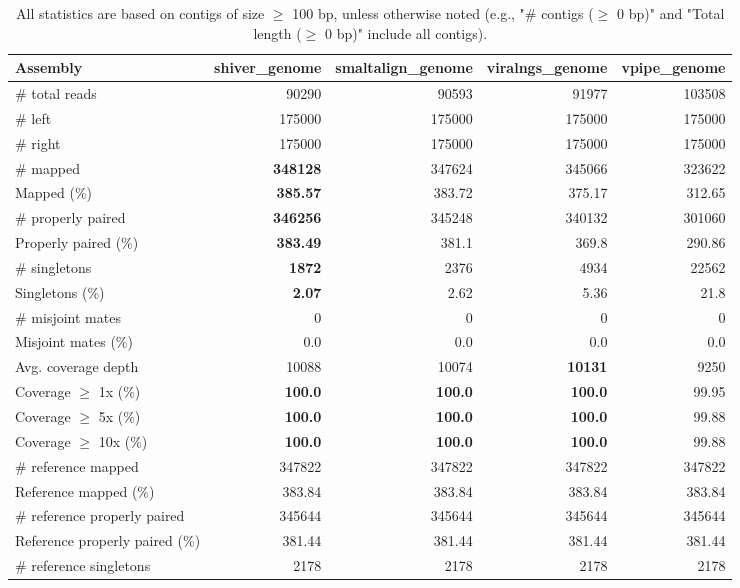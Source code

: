 \documentclass[12pt,a4paper]{article}
\begin{document}
\begin{table}[ht]
\begin{center}
\caption{All statistics are based on contigs of size $\geq$ 100 bp, unless otherwise noted (e.g., "\# contigs ($\geq$ 0 bp)" and "Total length ($\geq$ 0 bp)" include all contigs).}
\begin{tabular}{|l*{4}{|r}|}
\hline
Assembly & shiver\_genome & smaltalign\_genome & viralngs\_genome & vpipe\_genome \\ \hline
\# total reads & 90290 & 90593 & 91977 & 103508 \\ \hline
\# left & 175000 & 175000 & 175000 & 175000 \\ \hline
\# right & 175000 & 175000 & 175000 & 175000 \\ \hline
\# mapped & {\bf 348128} & 347624 & 345066 & 323622 \\ \hline
Mapped (\%) & {\bf 385.57} & 383.72 & 375.17 & 312.65 \\ \hline
\# properly paired & {\bf 346256} & 345248 & 340132 & 301060 \\ \hline
Properly paired (\%) & {\bf 383.49} & 381.1 & 369.8 & 290.86 \\ \hline
\# singletons & {\bf 1872} & 2376 & 4934 & 22562 \\ \hline
Singletons (\%) & {\bf 2.07} & 2.62 & 5.36 & 21.8 \\ \hline
\# misjoint mates & 0 & 0 & 0 & 0 \\ \hline
Misjoint mates (\%) & 0.0 & 0.0 & 0.0 & 0.0 \\ \hline
Avg. coverage depth & 10088 & 10074 & {\bf 10131} & 9250 \\ \hline
Coverage $\geq$ 1x (\%) & {\bf 100.0} & {\bf 100.0} & {\bf 100.0} & 99.95 \\ \hline
Coverage $\geq$ 5x (\%) & {\bf 100.0} & {\bf 100.0} & {\bf 100.0} & 99.88 \\ \hline
Coverage $\geq$ 10x (\%) & {\bf 100.0} & {\bf 100.0} & {\bf 100.0} & 99.88 \\ \hline
\# reference mapped & 347822 & 347822 & 347822 & 347822 \\ \hline
Reference mapped (\%) & 383.84 & 383.84 & 383.84 & 383.84 \\ \hline
\# reference properly paired & 345644 & 345644 & 345644 & 345644 \\ \hline
Reference properly paired (\%) & 381.44 & 381.44 & 381.44 & 381.44 \\ \hline
\# reference singletons & 2178 & 2178 & 2178 & 2178 \\ \hline

\end{tabular}
\end{center}
\end{table}
\end{document}
